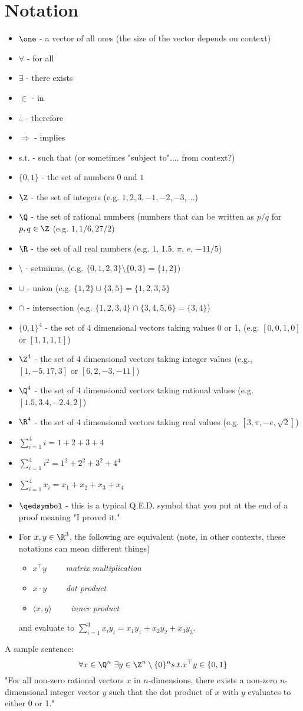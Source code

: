 \documentclass[../open-optimization/open-optimization.tex]{subfiles}
\begin{document}
\newpage
\section*{Notation}
\begin{itemize}
\item $\one$ - a vector of all ones (the size of the vector depends on context)
\item $\forall$ - for all
\item $\exists$ - there exists
\item $\in$ - in
\item $\therefore$ - therefore
\item $\Rightarrow$ - implies
\item s.t.  - such that (or sometimes "subject to".... from context?)
\item $\{0,1\}$ - the set of numbers $0$ and $1$
\item $\Z$ - the set of integers (e.g. $1,2,3,-1,-2,-3,...$)
\item $\Q$ - the set of rational numbers (numbers that can be written as $p/q$ for $p,q \in \Z$ (e.g. $1, 1/6, 27/2$)
\item $\R$  - the set of all real numbers (e.g. 1, 1.5, $\pi$, $e$, $-11/5$)
\item $\setminus$ - setminus, (e.g.  $\{0,1,2,3\} \setminus \{0,3\} = \{1,2\}$)
\item $\cup$ - union (e.g.  $\{1,2\} \cup \{3,5\} = \{1,2,3,5\}$
\item $\cap$ - intersection (e.g. $\{1,2,3,4\} \cap \{3,4,5,6\} = \{3,4\}$)
\item $\{0,1\}^4$ - the set of 4 dimensional vectors taking values 0 or 1, (e.g. $[0,0,1,0]$ or $[1,1,1,1]$)
\item $\Z^4$ - the set of 4 dimensional vectors taking integer values (e.g., $[1,-5,17,3]$ or $[6 , 2, -3, -11]$)
\item $\Q^4$ - the set of 4 dimensional vectors taking rational values (e.g. $[1.5, 3.4, -2.4, 2]$)
\item $\R^4$ - the set of 4 dimensional vectors taking real values (e.g. $[3, \pi, -e, \sqrt{2}]$)
\item $\sum_{i=1}^4 i  = 1 + 2 + 3 + 4$
\item $\sum_{i=1}^4 i^2 = 1^2 + 2^2 + 3^2 + 4^4$
\item $\sum_{i=1}^4 x_i = x_1 + x_2 + x_3 + x_4$
\item $\qedsymbol$ - this is a typical Q.E.D. symbol that you put at the end of a proof meaning "I proved it."
\item For $x,y \in \R^3$, the following are equivalent (note, in other contexts, these notations can mean different things)
\begin{itemize}
\item $x^\top y$ \ \ \ \ \emph{matrix multiplication}
\item $x \cdot y$ \ \ \ \ \emph{dot product}
\item $\langle x,y\rangle$ \ \ \ \ \emph{inner product}
\end{itemize}
and evaluate to $\sum_{i=1}^3 x_i y_i = x_1 y_1 + x_2 y_2 + x_3 y_3$.
\end{itemize}


A sample sentence:
$$
\forall x \in \Q^n \ \exists y \in \Z^n\setminus \{0\}^n s.t.  x^\top y \in \{0,1\}
$$
"For all non-zero rational vectors $x$ in $n$-dimensions, there exists a non-zero $n$-dimensional integer vector $y$ such that the dot product of $x$ with $y$ evaluates to either 0 or 1."
\end{document}
